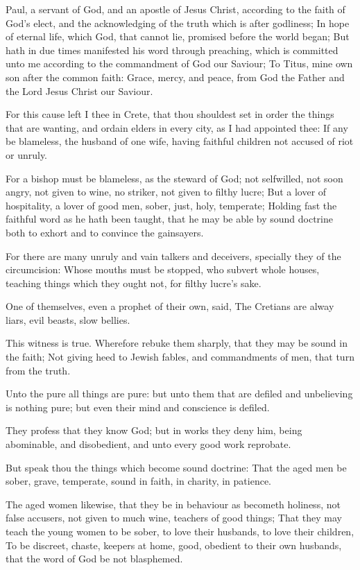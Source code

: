 \Chapter
\Verse Paul, a servant of God, and an apostle of Jesus Christ, according to the faith of God's elect, and the acknowledging of the truth which is after godliness; \Verse In hope of eternal life, which God, that cannot lie, promised before the world began; \Verse But hath in due times manifested his word through preaching, which is committed unto me according to the commandment of God our Saviour; \Verse To Titus, mine own son after the common faith: Grace, mercy, and peace, from God the Father and the Lord Jesus Christ our Saviour.

\Verse For this cause left I thee in Crete, that thou shouldest set in order the things that are wanting, and ordain elders in every city, as I had appointed thee: \Verse If any be blameless, the husband of one wife, having faithful children not accused of riot or unruly.

\Verse For a bishop must be blameless, as the steward of God; not selfwilled, not soon angry, not given to wine, no striker, not given to filthy lucre; \Verse But a lover of hospitality, a lover of good men, sober, just, holy, temperate; \Verse Holding fast the faithful word as he hath been taught, that he may be able by sound doctrine both to exhort and to convince the gainsayers.

\Verse For there are many unruly and vain talkers and deceivers, specially they of the circumcision: \Verse Whose mouths must be stopped, who subvert whole houses, teaching things which they ought not, for filthy lucre's sake.

\Verse One of themselves, even a prophet of their own, said, The Cretians are alway liars, evil beasts, slow bellies.

\Verse This witness is true. Wherefore rebuke them sharply, that they may be sound in the faith; \Verse Not giving heed to Jewish fables, and commandments of men, that turn from the truth.

\Verse Unto the pure all things are pure: but unto them that are defiled and unbelieving is nothing pure; but even their mind and conscience is defiled.

\Verse They profess that they know God; but in works they deny him, being abominable, and disobedient, and unto every good work reprobate.


\Chapter
\Verse But speak thou the things which become sound doctrine: \Verse That the aged men be sober, grave, temperate, sound in faith, in charity, in patience.

\Verse The aged women likewise, that they be in behaviour as becometh holiness, not false accusers, not given to much wine, teachers of good things; \Verse That they may teach the young women to be sober, to love their husbands, to love their children, \Verse To be discreet, chaste, keepers at home, good, obedient to their own husbands, that the word of God be not blasphemed.

